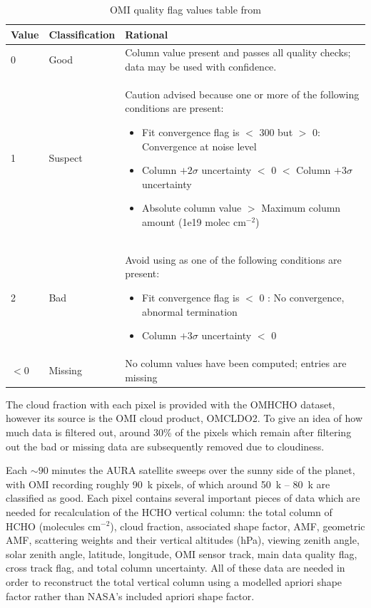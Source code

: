       \begin{table}
        \caption{OMI quality flag values table from \textcite{Kurosu2014}}
        \begin{tabular}{  l  l  p{10cm} }
          \hline
          \textbf{Value} & \textbf{Classification} & \textbf{Rational} 
          \\ \hline
          0 & Good & Column value present and passes all quality checks; data may be used with confidence. 
          \\ \hline
          1 & Suspect & Caution advised because one or more of the following conditions are present: 
          \begin{itemize}
            \item Fit convergence flag is $<$ 300 but $>$ 0: Convergence at noise level
            \item Column $+ 2 \sigma$ uncertainty $<$ 0 $<$ Column $ + 3 \sigma $ uncertainty
            \item Absolute column value $>$ Maximum column amount (1e19 molec cm$^{-2}$)
          \end{itemize}
          \\ \hline
          2 & Bad & Avoid using as one of the following conditions are present: 
          \begin{itemize}
            \item Fit convergence flag is $<$ 0 : No convergence, abnormal termination
            \item Column $+ 3 \sigma$ uncertainty $<$ 0
          \end{itemize}
          \\ \hline
          $<0$ & Missing & No column values have been computed; entries are missing
          \\ \hline
        \end{tabular}
        \label{Model:Datasets:OMHCHO:tab_qflag}
      \end{table}
      
      The cloud fraction with each pixel is provided with the OMHCHO dataset, however its source is the OMI cloud product, OMCLDO2.
      To give an idea of how much data is filtered out, around 30\% of the pixels which remain after filtering out the bad or missing data are subsequently removed due to cloudiness.
      
      Each $\sim90$ minutes the AURA satellite sweeps over the sunny side of the planet, with OMI recording roughly 90~k pixels, of which around 50~k -- 80~k are classified as good.
      Each pixel contains several important pieces of data which are needed for recalculation of the HCHO vertical column: the total column of HCHO (molecules cm$^{-2}$), cloud fraction, associated shape factor, AMF, geometric AMF, scattering weights and their vertical altitudes (hPa), viewing zenith angle, solar zenith angle, latitude, longitude, OMI sensor track, main data quality flag, cross track flag, and total column uncertainty.
      All of these data are needed in order to reconstruct the total vertical column using a modelled apriori shape factor rather than NASA's included apriori shape factor.
      
